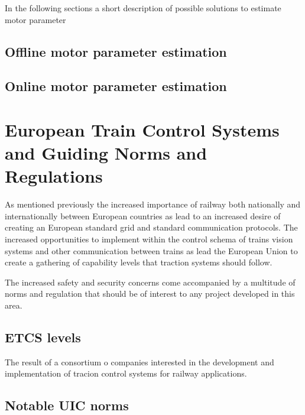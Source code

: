 In the following sections a short description of possible solutions to estimate motor parameter 
\subsection{Offline motor parameter estimation}
\subsection{Online motor parameter estimation}

\section{European Train Control Systems and Guiding Norms and Regulations}
As mentioned previously the increased importance of railway both nationally and internationally between European countries as lead to an increased desire of creating an European standard grid and standard communication protocols. The increased opportunities to implement within the control schema of trains vision systems and other communication between trains as lead the European Union to create a gathering of capability levels that traction systems should follow.

The increased safety and security concerns come accompanied by a multitude of norms and regulation that should be of interest to any project developed in this area.

\subsection{ETCS levels}
The result of a consortium o companies interested in the development and implementation of tracion control systems for railway applications.
\subsection{Notable UIC norms}

